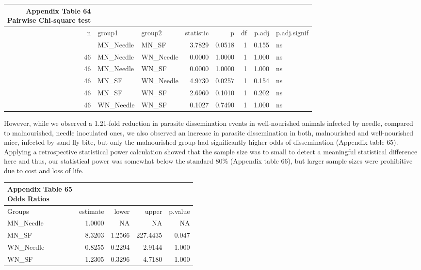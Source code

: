 \documentclass[
  12pt,
  letterpaper,
]{article}
\begin{document}
\begingroup
\fontsize{12.0pt}{14.4pt}\selectfont
\begin{longtable}{rllrrrrl}
\caption*{
{\large \textbf{Appendix Table 64}} \\ 
{\small \textbf{Pairwise Chi-square test}}
} \\ 
\toprule
{n} & {group1} & {group2} & {statistic} & {p} & {df} & {p.adj} & {p.adj.signif} \\ 
\midrule\addlinespace[2.5pt]
46 & MN\_Needle & MN\_SF & 3.7829 & 0.0518 & 1 & 0.155 & ns \\ 
46 & MN\_Needle & WN\_Needle & 0.0000 & 1.0000 & 1 & 1.000 & ns \\ 
46 & MN\_Needle & WN\_SF & 0.0000 & 1.0000 & 1 & 1.000 & ns \\ 
46 & MN\_SF & WN\_Needle & 4.9730 & 0.0257 & 1 & 0.154 & ns \\ 
46 & MN\_SF & WN\_SF & 2.6960 & 0.1010 & 1 & 0.202 & ns \\ 
46 & WN\_Needle & WN\_SF & 0.1027 & 0.7490 & 1 & 1.000 & ns \\ 
\bottomrule
\end{longtable}
\endgroup

However, while we observed a 1.21-fold reduction in parasite dissemination events in well-nourished animals infected by needle, compared to malnourished, needle inoculated ones, we also observed an increase in parasite dissemination in both, malnourished and well-nourished mice, infected by sand fly bite, but only the malnourished group had significantly higher odds of dissemination (Appendix table 65). Applying a retrospective statistical power calculation showed that the sample size was to small to detect a meaningful statistical difference here and thus, our statistical power was somewhat below the standard 80\% (Appendix table 66), but larger sample sizes were prohibitive due to cost and loss of life.

\begingroup
\fontsize{12.0pt}{14.4pt}\selectfont
\begin{longtable}{l|rrrr}
\caption*{
{\large \textbf{Appendix Table 65}} \\ 
{\small \textbf{Odds Ratios}}
} \\ 
\toprule
Groups & {estimate} & {lower} & {upper} & {p.value} \\ 
\midrule\addlinespace[2.5pt]
MN\_Needle & 1.0000 & NA & NA & NA \\ 
MN\_SF & 8.3203 & 1.2566 & 227.4435 & 0.047 \\ 
WN\_Needle & 0.8255 & 0.2294 &   2.9144 & 1.000 \\ 
WN\_SF & 1.2305 & 0.3296 &   4.7180 & 1.000 \\ 
\bottomrule
\end{longtable}
\endgroup
\end{document}
